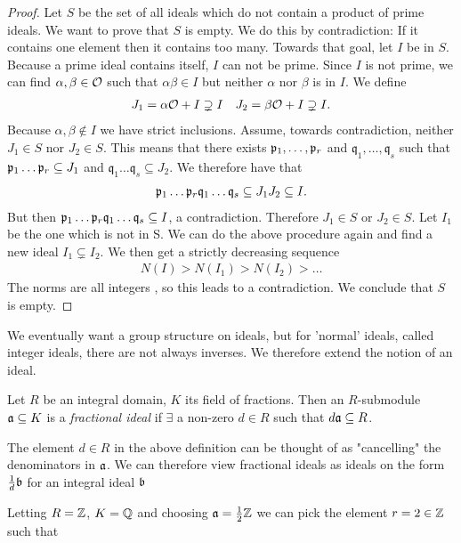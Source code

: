     \begin{proof}
        Let \(S\) be the set of all ideals which do not contain a product of prime ideals. We want to prove that \(S\) is empty. We do this by contradiction: If it contains one element then it contains too many. Towards that goal, let \(I\) be in \(S\). Because a prime ideal contains itself, \(I\) can not be prime. Since \(I\) is not prime, we can find \(\alpha, \beta\in\mathcal{O}\) such that \(\alpha\beta\in I\) but neither \(\alpha\) nor \(\beta\) is in \(I\). We define 
        \begin{align*}
            J_1 = \alpha\mathcal{O} + I\supsetneq I\quad J_2 = \beta\mathcal{O} + I\supsetneq I.
        \end{align*}
        Because \(\alpha, \beta\not\in I\) we have strict inclusions. Assume, towards contradiction, neither \(J_1\in S\) nor \(J_2\in S\). This means that there exists \(\mathfrak{p}_1, \dots , \mathfrak{p}_r\) and \(\mathfrak{q}_1, \dots ,\mathfrak{q}_s\) such that \(\mathfrak{p}_1 \dots \mathfrak{p}_r \subseteq J_1\) and \(\mathfrak{q}_1 \dots \mathfrak{q}_s \subseteq J_2\). We therefore have that
        \begin{align*}
            \mathfrak{p}_1 \dots \mathfrak{p}_r \mathfrak{q}_1 \dots \mathfrak{q}_s \subseteq J_1J_2\subseteq I.
        \end{align*}
        But then \(\mathfrak{p}_1 \dots \mathfrak{p}_r \mathfrak{q}_1 \dots \mathfrak{q}_s\subseteq I\), a contradiction. Therefore \(J_1\in S\) or \(J_2\in S\). Let \(I_1\) be the one which is not in S. We can do the above procedure again and find a new ideal \(I_1\subsetneq I_2\). We then get a strictly decreasing sequence
        \begin{align*}
            N(I) > N(I_1) > N(I_2) > \dots
        \end{align*}
        The norms are all integers , so this leads to a contradiction. We conclude that \(S\) is empty.
    \end{proof}
    We eventually want a group structure on ideals, but for 'normal' ideals, called integer ideals, there are not always inverses. We therefore extend the notion of an ideal.
    \begin{definition}
        Let \(R\) be an integral domain, \(K\) its field of fractions. Then an \(R\)-submodule \(\mathfrak{a} \subseteq K\) is a \emph{fractional ideal} if \(\exists\) a non-zero \(d\in R\) such that \(d\mathfrak{a}\subseteq R\). 
    \end{definition}
    
    The element \(d\in R\) in the above definition can be thought of as "cancelling" the denominators in \(\mathfrak{a}\). We can therefore view fractional ideals as ideals on the form \(\frac{1}{d}\mathfrak{b}\) for an integral ideal \(\mathfrak{b}\)\par
    Letting \(R=\mathbb{Z}\), \(K=\mathbb{Q}\) and choosing \(\mathfrak{a} = \frac{1}{2}\mathbb{Z}\) we can pick the element \(r = 2 \in \mathbb{Z}\) such that
    
